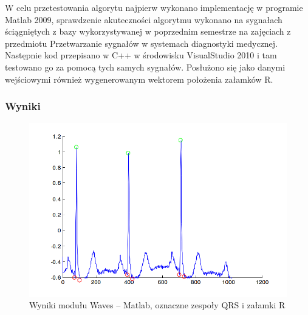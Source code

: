 \documentclass[a4paper, 11pt]{article}
\begin{document}
W celu przetestowania algorytu najpierw wykonano implementację w programie Matlab 2009, sprawdzenie akuteczności algorytmu wykonano na sygnałach ściągniętych z bazy wykorzystywanej w poprzednim semestrze na zajęciach z przedmiotu Przetwarzanie sygnałów w systemach diagnostyki medycznej. 
Następnie kod przepisano w C++ w środowisku VisualStudio 2010 i tam testowano go za pomocą tych samych sygnałów. Posłużono się jako danymi wejściowymi również wygenerowanym wektorem położenia załamków R.

\subsubsection{Wyniki}
\label{sec:st_interval:results}
\begin{center}
%
\begin{figure}
\begin{centering}
\includegraphics[scale=0.4]{include/waves_matlab}
\par\end{centering}

\caption{Wyniki modułu Waves -- Matlab, oznaczne zespoły QRS i załamki R}
\label{fig:waves_matlab}
\end{figure}

\par\end{center}
\end{document}
